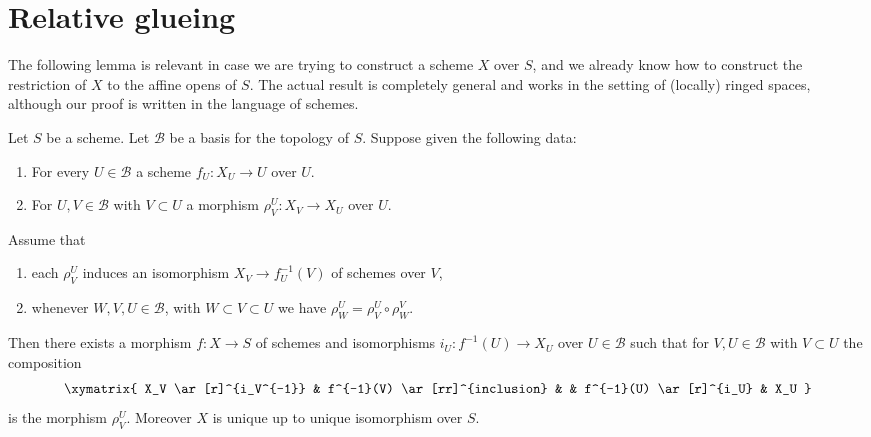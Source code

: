\section{Relative glueing}
\label{section-relative-glueing}

\noindent
The following lemma is relevant in case we are trying to construct a
scheme $X$ over $S$, and we already know how to construct the restriction
of $X$ to the affine opens of $S$. The actual result is completely general
and works in the setting of (locally) ringed spaces, although our proof
is written in the language of schemes.

\begin{lemma}
\label{lemma-relative-glueing}
Let $S$ be a scheme.
Let $\mathcal{B}$ be a basis for the topology of $S$.
Suppose given the following data:
\begin{enumerate}
\item For every $U \in \mathcal{B}$ a scheme $f_U : X_U \to U$ over $U$.
\item For $U, V \in \mathcal{B}$ with $V \subset U$ a morphism
$\rho^U_V : X_V \to X_U$ over $U$.
\end{enumerate}
Assume that
\begin{enumerate}
\item[(a)] each $\rho^U_V$ induces an isomorphism
$X_V \to f_U^{-1}(V)$ of schemes over $V$,
\item[(b)] whenever $W, V, U \in \mathcal{B}$, with
$W \subset V \subset U$ we have $\rho^U_W = \rho^U_V \circ \rho ^V_W$.
\end{enumerate}
Then there exists a morphism $f : X \to S$ of schemes
and isomorphisms $i_U : f^{-1}(U) \to X_U$ over $U \in \mathcal{B}$
such that for $V, U \in \mathcal{B}$ with $V \subset U$ the composition
$$
\xymatrix{
X_V \ar[r]^{i_V^{-1}} &
f^{-1}(V) \ar[rr]^{inclusion} & &
f^{-1}(U) \ar[r]^{i_U} &
X_U
}
$$
is the morphism $\rho^U_V$. Moreover $X$ is unique up to
unique isomorphism over $S$.
\end{lemma}

